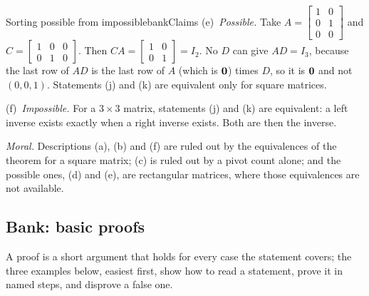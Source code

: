 \documentclass[11pt]{article}
\begin{document}
\begin{exmp}{Sorting possible from impossible}{bankClaims}
(e)~\emph{Possible.} Take $A=\begin{bmatrix}1&0\\0&1\\0&0\end{bmatrix}$ and $C=\begin{bmatrix}1&0&0\\0&1&0\end{bmatrix}$. Then $CA=\begin{bmatrix}1&0\\0&1\end{bmatrix}=I_2$. No $D$ can give $AD=I_3$, because the last row of $AD$ is the last row of $A$ (which is $\mathbf{0}$) times $D$, so it is $\mathbf{0}$ and not $(0,0,1)$. Statements (j) and (k) are equivalent only for square matrices.

(f)~\emph{Impossible.} For a $3\times3$ matrix, statements (j) and (k) are equivalent: a left inverse exists exactly when a right inverse exists. Both are then the inverse.

\emph{Moral.} Descriptions (a), (b) and (f) are ruled out by the equivalences of the theorem for a square matrix; (c) is ruled out by a pivot count alone; and the possible ones, (d) and (e), are rectangular matrices, where those equivalences are not available.
\end{exmp}

\subsection*{Bank: basic proofs}

A proof is a short argument that holds for every case the statement covers; the three examples below, easiest first, show how to read a statement, prove it in named steps, and disprove a false one.
\end{document}
